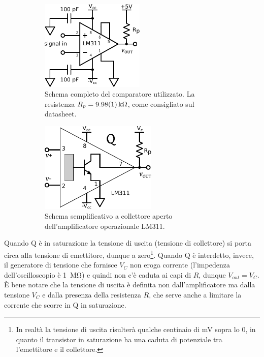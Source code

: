 \begin{figure}[ht]
        \centering
        \begin{subfigure}[c]{0.5\textwidth}
		\centering
		  \includegraphics[height=4.3cm]{../E04/latex/c_comparatore.pdf}
		  \caption{Schema completo del comparatore utilizzato. La resistenza $R_p=\SI{9.98\pm0.01}{\kilo\ohm}$, come consigliato sul datasheet.}
		  \label{cir4:comparatore}
        \end{subfigure}%
    \quad
        \begin{subfigure}[c]{0.45\textwidth}
		\centering
		  \includegraphics[height=4.3cm]{../E04/latex/c_LM311.pdf}
		  \caption{Schema semplificativo a collettore aperto dell'amplificatore operazionale LM311.}
		  \label{cir4:open_collector}
        \end{subfigure}
	\caption{}
\end{figure}

Quando Q è in saturazione la tensione di uscita (tensione di collettore) si porta circa alla tensione di emettitore, dunque a zero\footnote{In realtà la tensione di uscita risulterà qualche centinaio di \si{\milli\volt} sopra lo $0$, in quanto il transistor in saturazione ha una caduta di potenziale tra l'emettitore e il collettore.}.
Quando Q è interdetto, invece, il generatore di tensione che fornisce $V_C$ non eroga corrente (l'impedenza dell'oscilloscopio è \SI{1}{\Mohm}) e quindi non c'è caduta ai capi di $R$, dunque $V_{out}=V_C$.
È bene notare che la tensione di uscita è definita non dall'amplificatore ma dalla tensione $V_C$ e dalla presenza della resistenza $R$, che serve anche a limitare la corrente che scorre in Q in saturazione.

